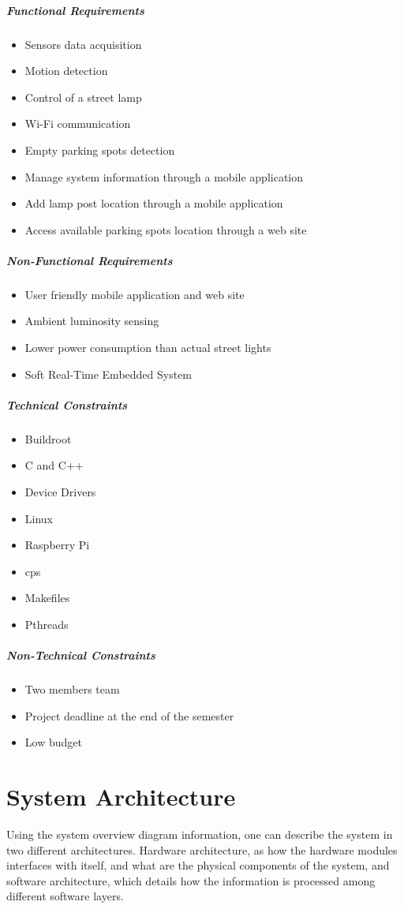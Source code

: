 \subparagraph{Functional Requirements}
\begin{itemize}
	\item Sensors data acquisition				
	\item Motion detection
	\item Control of a street lamp
	\item Wi-Fi communication
	\item Empty parking spots detection
	\item Manage system information through a mobile application
	\item Add lamp post location through a mobile application
	\item Access available parking spots location through a web site
\end{itemize}

\subparagraph{Non-Functional Requirements}
\begin{itemize}
	\item User friendly mobile application and web site
	\item Ambient luminosity sensing
	\item Lower power consumption than actual street lights
	\item Soft Real-Time Embedded System
\end{itemize}

\subparagraph{Technical Constraints}
\begin{itemize}
	\item Buildroot
	\item C and C++ 
	\item Device Drivers
	\item Linux
	\item Raspberry Pi
	\item \ac{cps}
	\item Makefiles
	\item Pthreads
\end{itemize}

\subparagraph{Non-Technical Constraints}
\begin{itemize}
	\item Two members team
	\item Project deadline at the end of the semester
	\item Low budget
\end{itemize}

\section{System Architecture}
Using the system overview diagram information, one can describe the system in two different architectures. Hardware architecture, as how the hardware modules interfaces with itself, and what are the physical components of the system, and software architecture, which details how the information is processed among different software layers.


